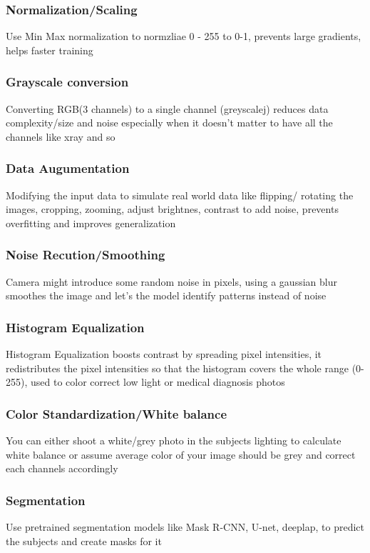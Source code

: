 \documentclass[12pt]{extarticle}
\begin{document}
\subsubsection{Normalization/Scaling}
Use Min Max normalization to normzliae 0 - 255 to 0-1, prevents
large gradients, helps faster training

\subsubsection{Grayscale conversion}
Converting RGB(3 channels) to a single channel (greyscalej) reduces data 
complexity/size and noise especially when it doesn't matter to have all the 
channels like xray and so

\subsubsection{Data Augumentation}
Modifying the input data to simulate real world data like flipping/ rotating
the images, cropping, zooming, adjust brightnes, contrast to add noise, 
prevents overfitting and improves generalization

\subsubsection{Noise Recution/Smoothing}
Camera might introduce some random noise in pixels, using a gaussian blur
smoothes the image and let's the model identify patterns instead of noise

\subsubsection{Histogram Equalization}
Histogram Equalization boosts contrast by spreading pixel intensities, it 
redistributes the pixel intensities so that the histogram covers the whole 
range (0-255), used to color correct low light or medical diagnosis photos

\subsubsection{Color Standardization/White balance}
You can either shoot a white/grey photo in the subjects lighting to calculate
white balance or assume average color of your image should be grey and correct 
each channels accordingly

\subsubsection{Segmentation}
Use pretrained segmentation models like Mask R-CNN, U-net, deeplap, to predict
the subjects and create masks for it
\end{document}
